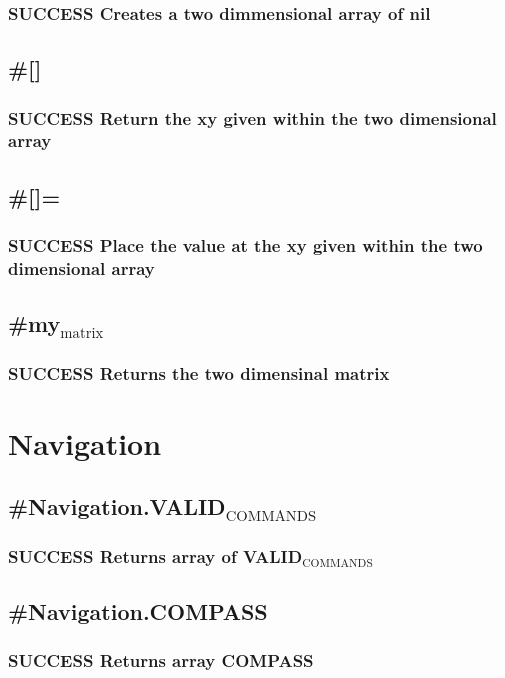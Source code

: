 \documentclass{article}
\begin{document}
\subsubsection{\textbf{SUCCESS} Creates a two dimmensional array of nil}
\label{sec-6-1-3}
\subsection{\#[]}
\label{sec-6-2}
\subsubsection{\textbf{SUCCESS} Return the xy given within the two dimensional array}
\label{sec-6-2-1}
\subsection{\#[]=}
\label{sec-6-3}
\subsubsection{\textbf{SUCCESS} Place the value at the xy given within the two dimensional array}
\label{sec-6-3-1}
\subsection{\#my$_{\mathrm{matrix}}$}
\label{sec-6-4}
\subsubsection{\textbf{SUCCESS} Returns the two dimensinal matrix}
\label{sec-6-4-1}
\section{Navigation}
\label{sec-7}
\subsection{\#Navigation.VALID$_{\mathrm{COMMANDS}}$}
\label{sec-7-1}
\subsubsection{\textbf{SUCCESS} Returns array of VALID$_{\mathrm{COMMANDS}}$}
\label{sec-7-1-1}
\subsection{\#Navigation.COMPASS}
\label{sec-7-2}
\subsubsection{\textbf{SUCCESS} Returns array COMPASS}
\label{sec-7-2-1}
\end{document}
